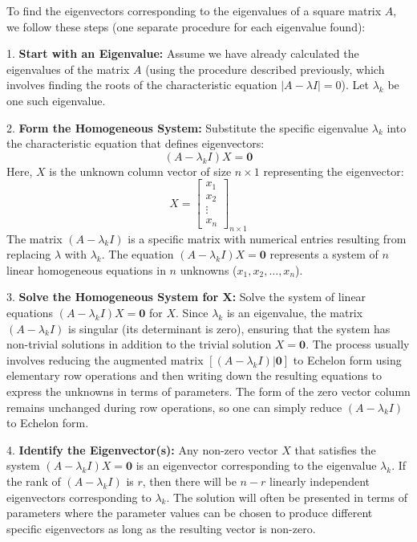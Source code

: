 \documentclass{article}
\begin{document}
To find the eigenvectors corresponding to the eigenvalues of a square matrix $A$, we follow these steps (one separate procedure for each eigenvalue found):

1.  \textbf{Start with an Eigenvalue:} Assume we have already calculated the eigenvalues of the matrix $A$ (using the procedure described previously, which involves finding the roots of the characteristic equation $|A - \lambda I| = 0$). Let $\lambda_k$ be one such eigenvalue.

2.  \textbf{Form the Homogeneous System:} Substitute the specific eigenvalue $\lambda_k$ into the characteristic equation that defines eigenvectors:
    \[ (A - \lambda_k I) X = \mathbf{0} \]
    Here, $X$ is the unknown column vector of size $n \times 1$ representing the eigenvector:
    \[ X = \begin{bmatrix} x_1 \\ x_2 \\ \vdots \\ x_n \end{bmatrix}_{n \times 1} \]
    The matrix $(A - \lambda_k I)$ is a specific matrix with numerical entries resulting from replacing $\lambda$ with $\lambda_k$. The equation $(A - \lambda_k I) X = \mathbf{0}$ represents a system of $n$ linear homogeneous equations in $n$ unknowns ($x_1, x_2, \dots, x_n$).

3.  \textbf{Solve the Homogeneous System for X:} Solve the system of linear equations $(A - \lambda_k I) X = \mathbf{0}$ for $X$. Since $\lambda_k$ is an eigenvalue, the matrix $(A - \lambda_k I)$ is singular (its determinant is zero), ensuring that the system has non-trivial solutions in addition to the trivial solution $X=\mathbf{0}$.
    The process usually involves reducing the augmented matrix $[(A - \lambda_k I) | \mathbf{0}]$ to Echelon form using elementary row operations and then writing down the resulting equations to express the unknowns in terms of parameters. The form of the zero vector column remains unchanged during row operations, so one can simply reduce $(A - \lambda_k I)$ to Echelon form.

4.  \textbf{Identify the Eigenvector(s):} Any non-zero vector $X$ that satisfies the system $(A - \lambda_k I) X = \mathbf{0}$ is an eigenvector corresponding to the eigenvalue $\lambda_k$. If the rank of $(A - \lambda_k I)$ is $r$, then there will be $n-r$ linearly independent eigenvectors corresponding to $\lambda_k$. The solution will often be presented in terms of parameters where the parameter values can be chosen to produce different specific eigenvectors as long as the resulting vector is non-zero.
\end{document}
